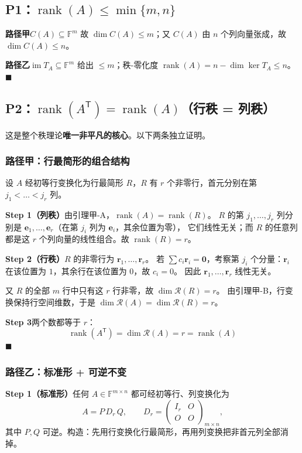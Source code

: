 \documentclass[11pt]{ctexart}
\newcommand{\rank}{\operatorname{rank}}
\newcommand{\im}{\operatorname{im}}
\newcommand{\F}{\mathbb{F}}
\newcommand{\T}{^{\mathsf T}}
\begin{document}
\subsection{P1：$\rank(A)\le\min\{m,n\}$}
\textbf{路径甲}\quad $C(A)\subseteq\F^m$ 故 $\dim C(A)\le m$；又 $C(A)$ 由 $n$ 个列向量张成，故 $\dim C(A)\le n$。

\textbf{路径乙}\quad $\im T_A\subseteq\F^m$ 给出 $\le m$；秩-零化度 $\rank(A)=n-\dim\ker T_A\le n$。\hfill$\blacksquare$

\subsection{P2：$\rank(A\T)=\rank(A)$（行秩 = 列秩）}

这是整个秩理论\textbf{唯一非平凡的核心}。以下两条独立证明。

\subsubsection{路径甲：行最简形的组合结构}
设 $A$ 经初等行变换化为行最简形 $R$，$R$ 有 $r$ 个非零行，首元分别在第 $j_1<\dots<j_r$ 列。

\textbf{Step 1（列秩）}\quad 由引理甲-A，$\rank(A)=\rank(R)$。
$R$ 的第 $j_1,\dots,j_r$ 列分别是 $\mathbf e_1,\dots,\mathbf e_r$（在第 $j_i$ 列为 $\mathbf e_i$，其余位置为零），
它们线性无关；而 $R$ 的任意列都是这 $r$ 个列向量的线性组合。故 $\rank(R)=r$。

\textbf{Step 2（行秩）}\quad $R$ 的非零行为 $\mathbf r_1,\dots,\mathbf r_r$。
若 $\sum c_i\mathbf r_i=\mathbf 0$，考察第 $j_i$ 个分量：$\mathbf r_i$ 在该位置为 $1$，其余行在该位置为 $0$，故 $c_i=0$。
因此 $\mathbf r_1,\dots,\mathbf r_r$ 线性无关。

又 $R$ 的全部 $m$ 行中只有这 $r$ 行非零，故 $\dim\mathcal R(R)=r$。
由引理甲-B，行变换保持行空间维数，于是 $\dim\mathcal R(A)=\dim\mathcal R(R)=r$。

\textbf{Step 3}\quad 两个数都等于 $r$：
\[
\boxed{\ \rank(A\T)=\dim\mathcal R(A)=r=\rank(A)\ }
\]
\hfill$\blacksquare$

\subsubsection{路径乙：标准形 + 可逆不变}
\textbf{Step 1（标准形）}\quad 任何 $A\in\F^{m\times n}$ 都可经初等行、列变换化为
\[
A=P\,D_r\,Q,\qquad D_r=\begin{pmatrix}I_r&O\\O&O\end{pmatrix}_{m\times n},
\]
其中 $P,Q$ 可逆。构造：先用行变换化行最简形，再用列变换把非首元列全部消掉。
\end{document}
